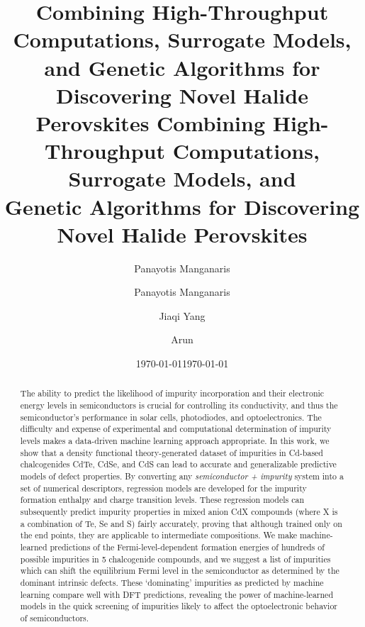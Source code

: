 \documentclass[aip, jmp, amsmath, amssymb, reprint]{revtex4-2}
\author{Panayotis Manganaris}
\date{\today}
\title{Combining High-Throughput Computations, Surrogate Models, and Genetic Algorithms for Discovering Novel Halide Perovskites}
\begin{document}
\title{%
Combining High-Throughput Computations, Surrogate Models, and\\
Genetic Algorithms for Discovering Novel Halide Perovskites
}

\author{Panayotis Manganaris}
\author{Jiaqi Yang}
\author{Arun }

\date{\today}
\begin{abstract}
The ability to predict the likelihood of impurity incorporation and their electronic energy levels in
semiconductors is crucial for controlling its conductivity, and thus the semiconductor's performance in solar
cells, photodiodes, and optoelectronics. The difficulty and expense of experimental and computational
determination of impurity levels makes a data-driven machine learning approach appropriate. In this work, we
show that a density functional theory-generated dataset of impurities in Cd-based chalcogenides CdTe, CdSe,
and CdS can lead to accurate and generalizable predictive models of defect properties. By converting any
\textit{semiconductor + impurity} system into a set of numerical descriptors, regression models are developed
for the impurity formation enthalpy and charge transition levels. These regression models can subsequently
predict impurity properties in mixed anion CdX compounds (where X is a combination of Te, Se and S) fairly
accurately, proving that although trained only on the end points, they are applicable to intermediate
compositions. We make machine-learned predictions of the Fermi-level-dependent formation energies of hundreds
of possible impurities in 5 chalcogenide compounds, and we suggest a list of impurities which can shift the
equilibrium Fermi level in the semiconductor as determined by the dominant intrinsic defects. These
`dominating' impurities as predicted by machine learning compare well with DFT predictions, revealing the
power of machine-learned models in the quick screening of impurities likely to affect the optoelectronic
behavior of semiconductors.
\end{abstract}

\maketitle
\end{document}
